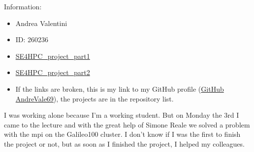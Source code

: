 \documentclass[a4paper]{article}
\begin{document}
    \noindent
    Information:
    \begin{itemize}
        \item Andrea Valentini
        \item ID: 260236
        \item [\faIcon{github}] \href{https://github.com/AndreVale69/SE4HPC_project_part1}{SE4HPC\_project\_part1}
        \item [\faIcon{github}] \href{https://github.com/AndreVale69/SE4HPC_project_part2}{SE4HPC\_project\_part2}
        \item If the links are broken, this is my link to my GitHub profile (\href{https://github.com/AndreVale69}{GitHub AndreVale69}), the projects are in the repository list.
    \end{itemize}
    I was working alone because I'm a working student. But on Monday the 3rd I came to the lecture and with the great help of Simone Reale we solved a problem with the mpi on the Galileo100 cluster. I don't know if I was the first to finish the project or not, but as soon as I finished the project, I helped my colleagues.
\end{document}
